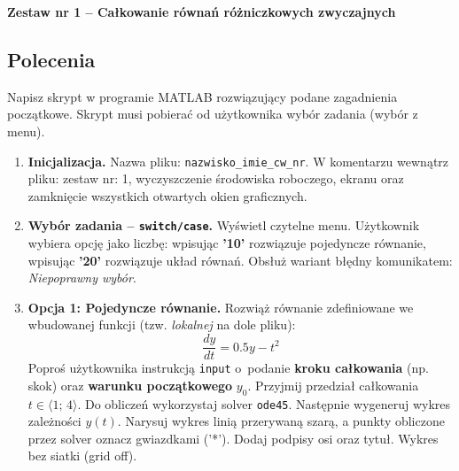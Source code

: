 \documentclass[a4paper,11pt]{article}
\begin{document}
\begin{center}
  {\large\bfseries Zestaw nr 1 \quad -- \quad Całkowanie równań różniczkowych zwyczajnych}
\end{center}
\hrulefill
\vspace{0.4cm}

\subsection*{Polecenia}

Napisz skrypt w programie MATLAB rozwiązujący podane zagadnienia początkowe. Skrypt musi pobierać od użytkownika wybór zadania (wybór z menu).

\begin{enumerate}[leftmargin=*, label=\textbf{\arabic*.}, itemsep=2pt]

  \item \textbf{Inicjalizacja.}
    Nazwa pliku: \texttt{nazwisko\_imie\_cw\_nr}. W komentarzu wewnątrz pliku: zestaw nr: 1, wyczyszczenie środowiska roboczego, ekranu oraz zamknięcie wszystkich otwartych okien graficznych.

  \item \textbf{Wybór zadania -- \texttt{switch/case}.}
    Wyświetl czytelne menu. Użytkownik wybiera opcję jako liczbę: wpisując \textbf{'10'} rozwiązuje pojedyncze równanie, wpisując \textbf{'20'} rozwiązuje układ równań. Obsłuż wariant błędny komunikatem: \textit{Niepoprawny wybór}.

  \item \textbf{Opcja 1: Pojedyncze równanie.}
    Rozwiąż równanie zdefiniowane we wbudowanej funkcji (tzw. \textit{lokalnej} na dole pliku):
    \[ \frac{dy}{dt} = 0.5y - t^2 \]
    Poproś użytkownika instrukcją \texttt{input} o~podanie \textbf{kroku całkowania} (np. skok) oraz \textbf{warunku początkowego} $y_0$. Przyjmij przedział całkowania $t \in \langle 1;\,4 \rangle$.
    Do obliczeń wykorzystaj solver \texttt{ode45}. Następnie wygeneruj wykres zależności $y(t)$. Narysuj wykres linią przerywaną szarą, a punkty obliczone przez solver oznacz gwiazdkami ('*'). Dodaj podpisy osi oraz tytuł. Wykres bez siatki (grid off).


\end{enumerate}
\end{document}
